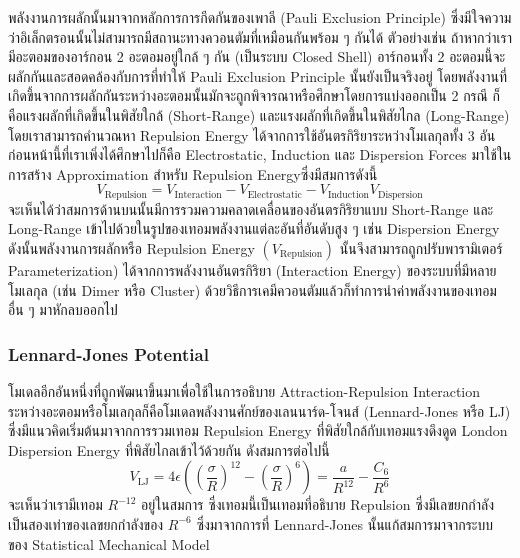 พลังงานการผลักนั้นมาจากหลักการการกีดกันของเพาลี (Pauli Exclusion Principle) ซึ่งมีใจความว่าอิเล็กตรอนนั้นไม่สามารถมีสถานะทางควอนตัมที่เหมือนกันพร้อม ๆ กันได้ ตัวอย่างเช่น ถ้าหากว่าเรามีอะตอมของอาร์กอน 2 อะตอมอยู่ใกล้ ๆ กัน (เป็นระบบ Closed Shell) อาร์กอนทั้ง 2 อะตอมนี้จะผลักกันและสอดคล้องกับการที่ทำให้ Pauli Exclusion Principle นั้นยังเป็นจริงอยู่ โดยพลังงานที่เกิดขึ้นจากการผลักกันระหว่างอะตอมนั้นมักจะถูกพิจารณาหรือศึกษาโดยการแบ่งออกเป็น 2 กรณี ก็คือแรงผลักที่เกิดขึ้นในพิสัยใกล้ (Short-Range) และแรงผลักที่เกิดขึ้นในพิสัยไกล (Long-Range) โดยเราสามารถคำนวณหา Repulsion Energy ได้จากการใช้อันตรกิริยาระหว่างโมเลกุลทั้ง 3 อันก่อนหน้านี้ที่เราเพิ่งได้ศึกษาไปก็คือ Electrostatic, Induction และ Dispersion Forces มาใช้ในการสร้าง Approximation สำหรับ Repulsion Energyซึ่งมีสมการดังนี้
%
\begin{equation}
  V_{\text{Repulsion}}
  =
  V_{\text{Interaction}}
  - V_{\text{Electrostatic}}
  - V_{\text{Induction}}
  V_{\text{Dispersion}}
\end{equation}
%
จะเห็นได้ว่าสมการด้านบนนั้นมีการรวมความคลาดเคลื่อนของอันตรกิริยาแบบ Short-Range และ Long-Range เข้าไปด้วยในรูปของเทอมพลังงานแต่ละอันที่อันดับสูง ๆ เช่น Dispersion Energy ดังนั้นพลังงานการผลักหรือ Repulsion Energy $(V_{\text{Repulsion}})$ นั้นจึงสามารถถูกปรับพารามิเตอร์ Parameterization) ได้จากการพลังงานอันตรกิริยา (Interaction Energy) ของระบบที่มีหลายโมเลกุล (เช่น Dimer หรือ Cluster) ด้วยวิธีการเคมีควอนตัมแล้วก็ทำการนำค่าพลังงานของเทอมอื่น ๆ มาหักลบออกไป

\subsubsection{Lennard-Jones Potential}

โมเดลอีกอันหนึ่งที่ถูกพัฒนาขึ้นมาเพื่อใช้ในการอธิบาย Attraction-Repulsion Interaction ระหว่างอะตอมหรือโมเลกุลก็คือโมเดลพลังงานศักย์ของเลนนาร์ด-โจนส์ (Lennard-Jones หรือ LJ) ซึ่งมีแนวคิดเริ่มต้นมาจากการรวมเทอม Repulsion Energy ที่พิสัยใกล้กับเทอมแรงดึงดูด London Dispersion Energy ที่พิสัยไกลเข้าไว้ด้วยกัน ดังสมการต่อไปนี้
%
\begin{equation}
  V_{\text{LJ}}
  =
  4 \epsilon
  \left(
  \left(
    \frac{\sigma}{R}
    \right)^{12}
  -
  \left(
    \frac{\sigma}{R}
    \right)^{6}
  \right)
  =
  \frac{a}{R^{12}}
  - \frac{C_{6}}{R^{6}}
\end{equation}
%
จะเห็นว่าเรามีเทอม $R^{-12}$ อยู่ในสมการ ซึ่งเทอมนี้เป็นเทอมที่อธิบาย Repulsion ซึ่งมีเลขยกกำลังเป็นสองเท่าของเลขยกกำลังของ $R^{-6}$ ซึ่งมาจากการที่ Lennard-Jones นั้นแก้สมการมาจากระบบของ Statistical Mechanical Model


